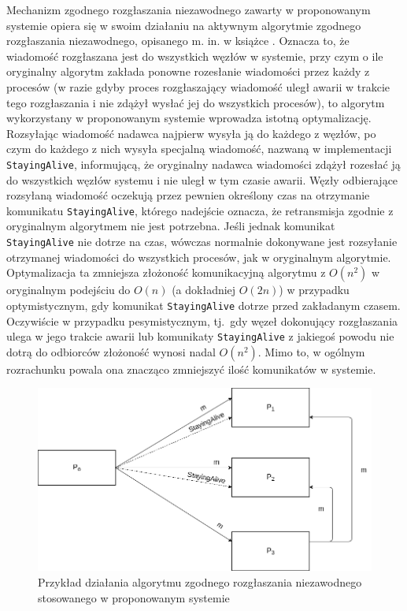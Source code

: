 Mechanizm zgodnego rozgłaszania niezawodnego zawarty w proponowanym systemie opiera się w swoim
działaniu na aktywnym algorytmie zgodnego rozgłaszania niezawodnego, opisanego m. in. w książce
\cite{Cachin:2011:IRS:1972495}. Oznacza to, że wiadomość rozgłaszana jest do wszystkich węzłów w
systemie, przy czym o ile oryginalny algorytm zakłada ponowne rozesłanie wiadomości przez każdy z
procesów (w razie gdyby proces rozgłaszający wiadomość uległ awarii w trakcie tego rozgłaszania i
nie zdążył wysłać jej do wszystkich procesów), to algorytm wykorzystany w proponowanym systemie
wprowadza istotną optymalizację. Rozsyłając wiadomość nadawca najpierw wysyła ją do każdego z
węzłów, po czym do każdego z nich wysyła specjalną wiadomość, nazwaną w implementacji
\texttt{StayingAlive}, informującą, że oryginalny nadawca wiadomości zdążył rozesłać ją do
wszystkich węzłów systemu i nie uległ w tym czasie awarii. Węzły odbierające rozsyłaną wiadomość
oczekują przez pewnien określony czas na otrzymanie komunikatu \texttt{StayingAlive}, którego
nadejście oznacza, że retransmisja zgodnie z oryginalnym algorytmem nie jest potrzebna. Jeśli jednak
komunikat \texttt{StayingAlive} nie dotrze na czas, wówczas normalnie dokonywane jest rozsyłanie
otrzymanej wiadomości do wszystkich procesów, jak w oryginalnym algorytmie. Optymalizacja ta
zmniejsza złożoność komunikacyjną algorytmu z $ O(n^2) $ w oryginalnym podejściu do $ O(n) $ (a
dokładniej $ O(2n) $) w przypadku optymistycznym, gdy komunikat \texttt{StayingAlive} dotrze przed
zakładanym czasem. Oczywiście w przypadku pesymistycznym, tj.\ gdy węzeł dokonujący rozgłaszania ulega w jego trakcie awarii lub komunikaty \texttt{StayingAlive} z jakiegoś powodu nie dotrą do odbiorców złożoność wynosi nadal $ O(n^2) $. Mimo to, w ogólnym rozrachunku powala ona znacząco zmniejszyć ilość komunikatów w systemie.

\begin{figure}[h!]
    \includegraphics[width=\linewidth]{images/04-FIFO_RRB.png}
    \caption{Przykład działania algorytmu zgodnego rozgłaszania niezawodnego stosowanego w proponowanym systemie}
    \label{figure:systemdescription_fifo_rrb}
\end{figure}

